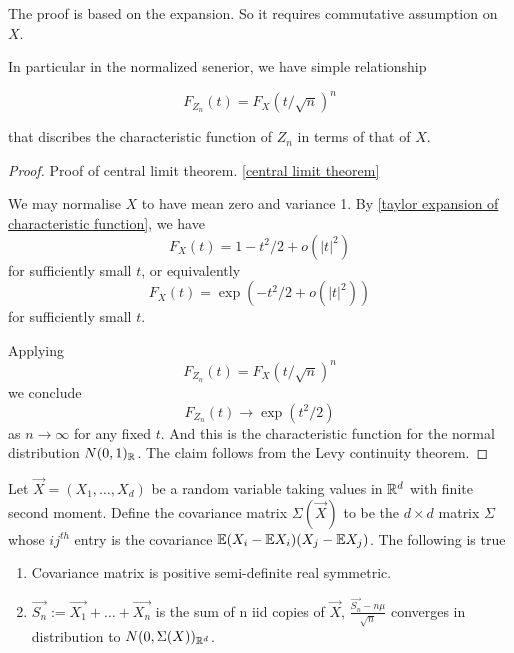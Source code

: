The proof is based on the expansion. So it requires commutative assumption on $X$.

In particular in the normalized senerior, we have simple relationship

\begin{equation*}
    F_{Z_n}(t) = F_X(t/\sqrt{n})^n
\end{equation*}

that discribes the characteristic function of $Z_n$ in terms of that of $X$.

\begin{proof}
    Proof of central limit theorem. \ref{central limit theorem}

    We may normalise $X$ to have mean zero and variance 1. By \ref{taylor expansion of characteristic function}, we have 
    \begin{equation*}
        F_X(t) =1-t^2/2 +o(|t|^2)
    \end{equation*}
    for sufficiently small $t$, or equivalently
    \begin{equation*}
        F_X (t) =\exp(-t^2/2+o(|t|^2))
    \end{equation*}
    for sufficiently small $t$.

    Applying 
    \begin{equation*}
        F_{Z_n}(t) = F_X(t/\sqrt{n})^n
    \end{equation*}
    we conclude 
    \begin{equation*}
        F_{Z_n}(t) \to \exp(t^2/2)
    \end{equation*}
    as $n\to \infty$ for any fixed $t$. And this is the characteristic function for the normal distribution $N(0,1)_{\mathbb{R}}$. 
    The claim follows from the Levy continuity theorem.
\end{proof}

\begin{theorem}
    \label{Vector-valued central limit theorem}
    Let $\overrightarrow{X} = (X_1,\dots,X_d)  $ be a random variable taking values in $\mathbb{R}^d$ with finite second moment. 
    Define the covariance matrix $\Sigma(\overrightarrow{X})$ to be the $d\times d$ matrix $\Sigma$ whose $ij^{th}$ entry is the covariance $\mathbb{E} (X_i-\mathbb{E} X_i)(X_j-\mathbb{E} X_j)$.
    The following is true
    \begin{enumerate}
        \item Covariance matrix is positive semi-definite real symmetric.
        \item $\overrightarrow{S_n} := \overrightarrow{X_1}+\dots+\overrightarrow{X_n}$ is the sum of n iid copies of $\overrightarrow{X}$, $\frac{\overrightarrow{S_n}-n\mu}{\sqrt{n}}$ converges in distribution to $N(0,\Sigma(X))_{\mathbb{R}^d}$.
    \end{enumerate}
\end{theorem}

